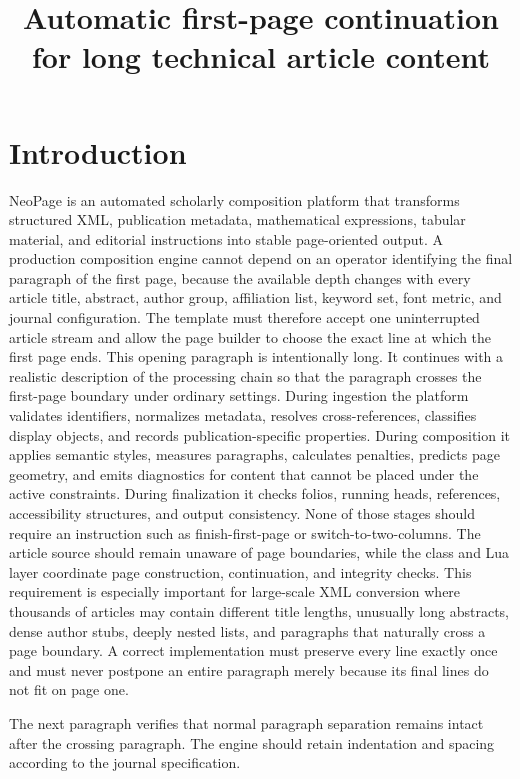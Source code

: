 \documentclass{tnqjournal}
\title{Automatic first-page continuation for long technical article content}
\begin{document}
\maketitle
\section{Introduction}
NeoPage is an automated scholarly composition platform that transforms structured XML, publication metadata, mathematical expressions, tabular material, and editorial instructions into stable page-oriented output. A production composition engine cannot depend on an operator identifying the final paragraph of the first page, because the available depth changes with every article title, abstract, author group, affiliation list, keyword set, font metric, and journal configuration. The template must therefore accept one uninterrupted article stream and allow the page builder to choose the exact line at which the first page ends. This opening paragraph is intentionally long. It continues with a realistic description of the processing chain so that the paragraph crosses the first-page boundary under ordinary settings. During ingestion the platform validates identifiers, normalizes metadata, resolves cross-references, classifies display objects, and records publication-specific properties. During composition it applies semantic styles, measures paragraphs, calculates penalties, predicts page geometry, and emits diagnostics for content that cannot be placed under the active constraints. During finalization it checks folios, running heads, references, accessibility structures, and output consistency. None of those stages should require an instruction such as finish-first-page or switch-to-two-columns. The article source should remain unaware of page boundaries, while the class and Lua layer coordinate page construction, continuation, and integrity checks. This requirement is especially important for large-scale XML conversion where thousands of articles may contain different title lengths, unusually long abstracts, dense author stubs, deeply nested lists, and paragraphs that naturally cross a page boundary. A correct implementation must preserve every line exactly once and must never postpone an entire paragraph merely because its final lines do not fit on page one.

The next paragraph verifies that normal paragraph separation remains intact after the crossing paragraph. The engine should retain indentation and spacing according to the journal specification.
\end{document}
